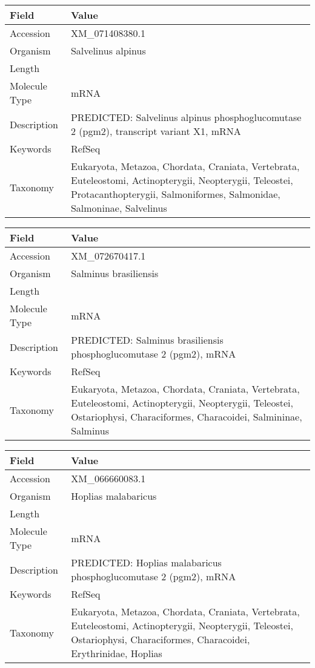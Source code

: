 \documentclass[10pt]{article}
\begin{document}
\vspace{1em}
{\footnotesize
\begin{longtable}{>{\raggedright\arraybackslash}p{4.5cm} >{\raggedright\arraybackslash}p{11.5cm}}
\textbf{Field} & \textbf{Value} \\
\hline
Accession & XM\_071408380.1 \\
Organism & Salvelinus alpinus \\
Length & 4580 \\
Molecule Type & mRNA \\
Description & PREDICTED: Salvelinus alpinus phosphoglucomutase 2 (pgm2), transcript variant X1, mRNA \\
Keywords & RefSeq \\
Taxonomy & Eukaryota, Metazoa, Chordata, Craniata, Vertebrata, Euteleostomi, Actinopterygii, Neopterygii, Teleostei, Protacanthopterygii, Salmoniformes, Salmonidae, Salmoninae, Salvelinus \\
\end{longtable}
}

\vspace{1em}
{\footnotesize
\begin{longtable}{>{\raggedright\arraybackslash}p{4.5cm} >{\raggedright\arraybackslash}p{11.5cm}}
\textbf{Field} & \textbf{Value} \\
\hline
Accession & XM\_072670417.1 \\
Organism & Salminus brasiliensis \\
Length & 3773 \\
Molecule Type & mRNA \\
Description & PREDICTED: Salminus brasiliensis phosphoglucomutase 2 (pgm2), mRNA \\
Keywords & RefSeq \\
Taxonomy & Eukaryota, Metazoa, Chordata, Craniata, Vertebrata, Euteleostomi, Actinopterygii, Neopterygii, Teleostei, Ostariophysi, Characiformes, Characoidei, Salmininae, Salminus \\
\end{longtable}
}

\vspace{1em}
{\footnotesize
\begin{longtable}{>{\raggedright\arraybackslash}p{4.5cm} >{\raggedright\arraybackslash}p{11.5cm}}
\textbf{Field} & \textbf{Value} \\
\hline
Accession & XM\_066660083.1 \\
Organism & Hoplias malabaricus \\
Length & 3132 \\
Molecule Type & mRNA \\
Description & PREDICTED: Hoplias malabaricus phosphoglucomutase 2 (pgm2), mRNA \\
Keywords & RefSeq \\
Taxonomy & Eukaryota, Metazoa, Chordata, Craniata, Vertebrata, Euteleostomi, Actinopterygii, Neopterygii, Teleostei, Ostariophysi, Characiformes, Characoidei, Erythrinidae, Hoplias \\
\end{longtable}
}
\end{document}
